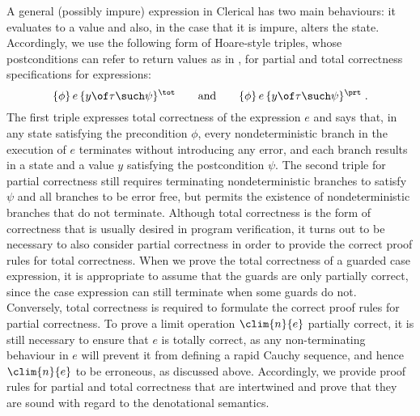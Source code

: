 A general (possibly impure) expression in  Clerical has two main behaviours: it evaluates to a value and also, in the case that 
it is impure, alters the state. 
Accordingly, we use the following form of Hoare-style triples, whose postconditions can refer to return values as in \cite{hot,HONDA201475,iris},
for partial and total correctness specifications for expressions:
\[
\{ \phi\} \, e\, \{ y \of \tau \such \psi \}^\tot
    \qquad\text{and}\qquad
\{ \phi\} \, e\, \{ y \of \tau \such \psi \}^\prt\;.
\]
The first triple expresses total correctness of the expression $e$ and says that,
in any state satisfying the precondition $\phi$, every nondeterministic branch in the execution of $e$ terminates without introducing any error, and each branch results in a state and a value $y$ satisfying the postcondition $\psi$.
The second triple for partial correctness still requires terminating nondeterministic branches to satisfy $\psi$ and all branches
to be  error free, but
permits the existence of nondeterministic branches that do not terminate.
Although total correctness is the form of correctness that is usually desired in program verification, it turns out  to be necessary to also consider partial correctness in order to provide the correct proof rules for total correctness.
When we prove the total correctness of a guarded case expression, it is appropriate to assume that the guards are only partially correct,
since the case expression can still  terminate when some guards do not.
Conversely, total correctness is required to formulate the correct proof rules for partial correctness.
To prove a limit operation $\clim{n}{e}$ partially correct, it is still necessary to ensure that $e$ is totally correct, as any non-terminating behaviour in $e$ will prevent it from defining a rapid Cauchy sequence, and hence $\clim{n}{e}$ to be erroneous, as discussed above. 
Accordingly, we provide proof rules for partial and total correctness that are intertwined and prove that they are sound with regard to the denotational semantics. 


